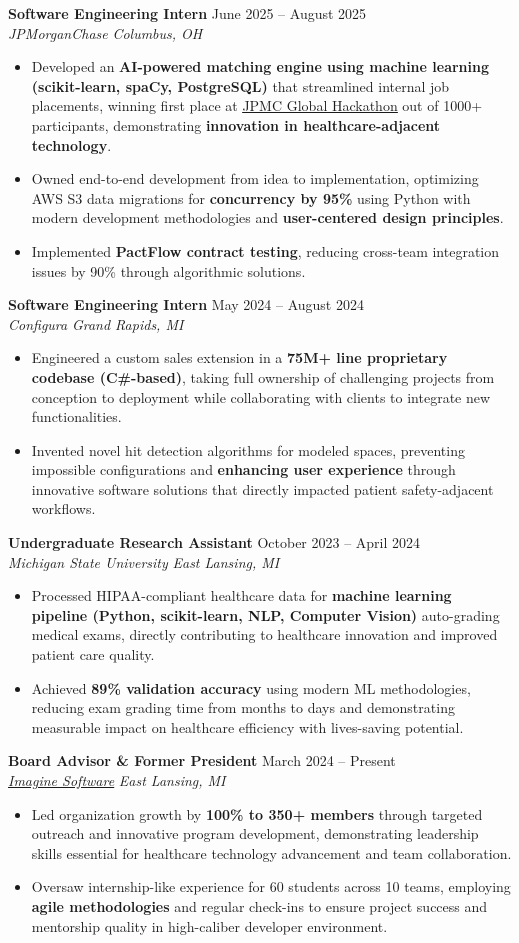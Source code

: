 \documentclass[letterpaper,11pt]{article}
\newcommand{\resumeItem}[1]{
  \item\small{
    {#1 \vspace{-2pt}}
  }
}
\newcommand{\resumeSubheading}[4]{
  \vspace{-2pt}\item
  \textbf{#1} \hfill #2 \\
  \textit{\small#3} \hfill \textit{\small #4} \\
  \vspace{-7pt} %
}
\newcommand{\resumeItemListStart}{\begin{itemize}}
\newcommand{\resumeItemListEnd}{\end{itemize}\vspace{-5pt}}
\begin{document}
    \resumeSubheading
      {Software Engineering Intern}{June 2025 -- August 2025}
      {JPMorganChase}{Columbus, OH}
    \resumeItemListStart
        \resumeItem{Developed an \textbf{AI-powered matching engine using machine learning (scikit-learn, spaCy, PostgreSQL)} that streamlined internal job placements, winning first place at \underline{\href{https://www.linkedin.com/posts/indi-de-silva_at-jpmorganchase-our-internship-program-activity-7355579081490354177-NYLE}{JPMC Global Hackathon}} out of 1000+ participants, demonstrating \textbf{innovation in healthcare-adjacent technology}.}
        \resumeItem{Owned end-to-end development from idea to implementation, optimizing AWS S3 data migrations for \textbf{concurrency by 95\%} using Python with modern development methodologies and \textbf{user-centered design principles}.}
        \resumeItem{Implemented \textbf{PactFlow contract testing}, reducing cross-team integration issues by 90\% through algorithmic solutions.}
    \resumeItemListEnd

    \resumeSubheading
      {Software Engineering Intern}{May 2024 -- August 2024}
      {Configura}{Grand Rapids, MI}
      \resumeItemListStart
        \resumeItem{Engineered a custom sales extension in a \textbf{75M+ line proprietary codebase (C\#-based)}, taking full ownership of challenging projects from conception to deployment while collaborating with clients to integrate new functionalities.}
        \resumeItem{Invented novel hit detection algorithms for modeled spaces, preventing impossible configurations and \textbf{enhancing user experience} through innovative software solutions that directly impacted patient safety-adjacent workflows.}
      \resumeItemListEnd

\resumeSubheading
      {Undergraduate Research Assistant}{October 2023 -- April 2024}
      {Michigan State University}{East Lansing, MI}
      \resumeItemListStart
        \resumeItem{Processed HIPAA-compliant healthcare data for \textbf{machine learning pipeline (Python, scikit-learn, NLP, Computer Vision)} auto-grading medical exams, directly contributing to healthcare innovation and improved patient care quality.}
        \resumeItem{Achieved \textbf{89\% validation accuracy} using modern ML methodologies, reducing exam grading time from months to days and demonstrating measurable impact on healthcare efficiency with lives-saving potential.}
      \resumeItemListEnd

      \resumeSubheading
      {Board Advisor \& Former President}{March 2024 -- Present}
      {\underline{\href{https://www.imagine-software.org/}{Imagine Software}}}{East Lansing, MI}
      \resumeItemListStart
        \resumeItem{Led organization growth by \textbf{100\% to 350+ members} through targeted outreach and innovative program development, demonstrating leadership skills essential for healthcare technology advancement and team collaboration.}
        \resumeItem{Oversaw internship-like experience for 60 students across 10 teams, employing \textbf{agile methodologies} and regular check-ins to ensure project success and mentorship quality in high-caliber developer environment.}
      \resumeItemListEnd
\end{document}
